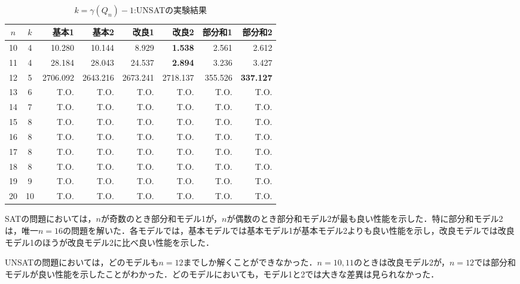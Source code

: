 \begin{table}[ht]
 \caption{$k=\gamma(Q_n)-1$:UNSATの実験結果}
 \label{tb:exUNSAT}
 \centering 
 \begin{tabular}{|c|c|r|r|r|r|r|r|} \hline
  $n$ & $k$ & 基本1 & 基本2 & 改良1 & 改良2 & 部分和1 & 部分和2 \\ \hline
  10 & 4 & 10.280 & 10.144 & 8.929 & \textbf{1.538} & 2.561 & 2.612 \\
  11 & 4 & 28.184 & 28.043 & 24.537 & \textbf{2.894} & 3.236 & 3.427 \\
  12 & 5 & 2706.092 & 2643.216 & 2673.241 & 2718.137 & 355.526 & \textbf{337.127} \\
  13 & 6 & T.O. & T.O. & T.O. & T.O. & T.O. & T.O. \\  
  14 & 7 & T.O. & T.O. & T.O. & T.O. & T.O. & T.O. \\   
  15 & 8 & T.O. & T.O. & T.O. & T.O. & T.O. & T.O. \\  
  16 & 8 & T.O. & T.O. & T.O. & T.O. & T.O. & T.O. \\
  17 & 8 & T.O. & T.O. & T.O. & T.O. & T.O. & T.O. \\
  18 & 8 & T.O. & T.O. & T.O. & T.O. & T.O. & T.O. \\
  19 & 9 & T.O. & T.O. & T.O. & T.O. & T.O. & T.O. \\
  20 & 10 & T.O. & T.O. & T.O. & T.O. & T.O. & T.O. \\ \hline
 \end{tabular}
\end{table}

SATの問題においては，$n$が奇数のとき部分和モデル1が，$n$が偶数のとき部分和モデル2が最も良い性能を示した．特に部分和モデル2は，唯一$n=16$の問題を解いた．各モデルでは，基本モデルでは基本モデル1が基本モデル2よりも良い性能を示し，改良モデルでは改良モデル1のほうが改良モデル2に比べ良い性能を示した．

UNSATの問題においては，どのモデルも$n=12$までしか解くことができなかった．$n=10,11$のときは改良モデル2が，$n=12$では部分和モデルが良い性能を示したことがわかった．どのモデルにおいても，モデル1と2では大きな差異は見られなかった．
